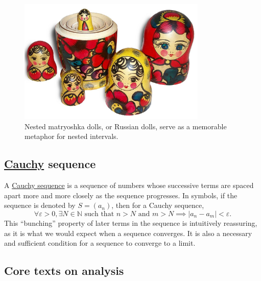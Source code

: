 \documentclass[
  a4paper,
]{article}
\begin{document}
\begin{figure}
\centering
\includegraphics[width=0.8\textwidth,height=\textheight]{images/matryoshka-open.jpg}
\caption[Nested matryoshka dolls, or Russian dolls, serve as a memorable
metaphor for nested intervals.]{Nested matryoshka dolls, or Russian
dolls, serve as a memorable metaphor for nested
intervals.\footnotemark{}}\label{fig:matryoshka}
\end{figure}

\subsection{\texorpdfstring{\href{https://en.wikipedia.org/wiki/Augustin-Louis_Cauchy}{Cauchy}
sequence}{Cauchy sequence}}\label{cauchy-sequence}

A \href{https://en.wikipedia.org/wiki/Cauchy_sequence}{Cauchy sequence}
is a sequence of numbers whose successive terms are spaced apart more
and more closely as the sequence progresses. In symbols, if the sequence
is denoted by \(S = (a_n)\), then for a Cauchy sequence, \[
\forall \varepsilon > 0, \exists N \in \mathbb{N} \text{ such that } n > N \text{ and } m > N \implies |a_n - a_m| < \varepsilon.
\] This ``bunching'' property of later terms in the sequence is
intuitively reassuring, as it is what we would expect when a sequence
converges. It is also a necessary and sufficient condition for a
sequence to converge to a limit.

\subsection{Core texts on analysis}\label{core-texts-on-analysis}
\end{document}
